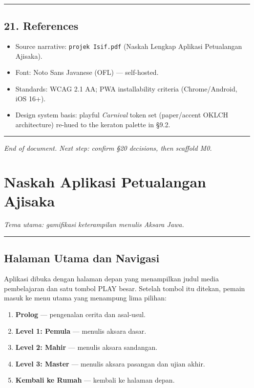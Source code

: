 \documentclass[
  11pt,
]{article}
\providecommand{\tightlist}{%
  \setlength{\itemsep}{0pt}\setlength{\parskip}{0pt}}
\begin{document}
\begin{center}\rule{0.5\linewidth}{0.5pt}\end{center}

\subsection{21. References}\label{references}

\begin{itemize}
\tightlist
\item
  Source narrative: \texttt{projek\ Isif.pdf} (Naskah Lengkap Aplikasi
  Petualangan Ajisaka).
\item
  Font: Noto Sans Javanese (OFL) --- self-hosted.
\item
  Standards: WCAG 2.1 AA; PWA installability criteria (Chrome/Android,
  iOS 16+).
\item
  Design system basis: playful \emph{Carnival} token set (paper/accent
  OKLCH architecture) re-hued to the keraton palette in §9.2.
\end{itemize}

\begin{center}\rule{0.5\linewidth}{0.5pt}\end{center}

\emph{End of document. Next step: confirm §20 decisions, then scaffold
M0.}

\section{Naskah Aplikasi Petualangan
Ajisaka}\label{naskah-aplikasi-petualangan-ajisaka}

\emph{Tema utama: gamifikasi keterampilan menulis Aksara Jawa.}

\begin{center}\rule{0.5\linewidth}{0.5pt}\end{center}

\subsection{Halaman Utama dan
Navigasi}\label{halaman-utama-dan-navigasi}

Aplikasi dibuka dengan halaman depan yang menampilkan judul media
pembelajaran dan satu tombol PLAY besar. Setelah tombol itu ditekan,
pemain masuk ke menu utama yang menampung lima pilihan:

\begin{enumerate}
\def\labelenumi{\arabic{enumi}.}
\tightlist
\item
  \textbf{Prolog} --- pengenalan cerita dan asal-usul.
\item
  \textbf{Level 1: Pemula} --- menulis aksara dasar.
\item
  \textbf{Level 2: Mahir} --- menulis aksara sandangan.
\item
  \textbf{Level 3: Master} --- menulis aksara pasangan dan ujian akhir.
\item
  \textbf{Kembali ke Rumah} --- kembali ke halaman depan.
\end{enumerate}
\end{document}

